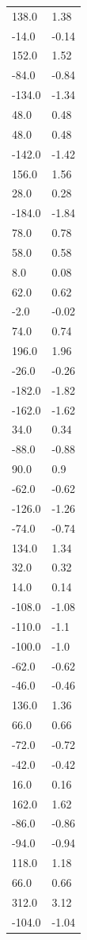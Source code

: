 \begin{longtable}{ll}
138.0 & 1.38 \\
-14.0 & -0.14 \\
152.0 & 1.52 \\
-84.0 & -0.84 \\
-134.0 & -1.34 \\
48.0 & 0.48 \\
48.0 & 0.48 \\
-142.0 & -1.42 \\
156.0 & 1.56 \\
28.0 & 0.28 \\
-184.0 & -1.84 \\
78.0 & 0.78 \\
58.0 & 0.58 \\
8.0 & 0.08 \\
62.0 & 0.62 \\
-2.0 & -0.02 \\
74.0 & 0.74 \\
196.0 & 1.96 \\
-26.0 & -0.26 \\
-182.0 & -1.82 \\
-162.0 & -1.62 \\
34.0 & 0.34 \\
-88.0 & -0.88 \\
90.0 & 0.9 \\
-62.0 & -0.62 \\
-126.0 & -1.26 \\
-74.0 & -0.74 \\
134.0 & 1.34 \\
32.0 & 0.32 \\
14.0 & 0.14 \\
-108.0 & -1.08 \\
-110.0 & -1.1 \\
-100.0 & -1.0 \\
-62.0 & -0.62 \\
-46.0 & -0.46 \\
136.0 & 1.36 \\
66.0 & 0.66 \\
-72.0 & -0.72 \\
-42.0 & -0.42 \\
16.0 & 0.16 \\
162.0 & 1.62 \\
-86.0 & -0.86 \\
-94.0 & -0.94 \\
118.0 & 1.18 \\
66.0 & 0.66 \\
312.0 & 3.12 \\
-104.0 & -1.04 \\

\end{longtable}
